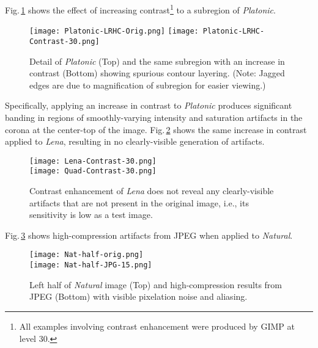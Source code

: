 \documentclass{article}
\begin{document}
Fig.\,\ref{contrast} shows the effect of increasing contrast\footnote{All examples involving
contrast enhancement were produced by GIMP at level 30.} to a subregion of {\em Platonic}.
\begin{figure}
   \centering
   \texttt{[image: Platonic-LRHC-Orig.png]}\vspace{3pt}
   \texttt{[image: Platonic-LRHC-Contrast-30.png]}
\caption{Detail of {\em Platonic} (Top) and the same
subregion with an increase in contrast (Bottom) showing spurious contour layering. (Note: Jagged
edges are due to magnification of subregion for easier viewing.)}
\label{contrast}
\end{figure} 
Specifically, applying an increase in contrast to {\em Platonic} produces
significant banding in regions of smoothly-varying intensity and saturation artifacts in
the corona at the center-top of the image.  Fig.\,\ref{contrastLena} shows
the same increase in contrast applied to {\em Lena}, resulting in no clearly-visible 
generation of artifacts. 

\begin{figure}
   \centering
   \texttt{[image: Lena-Contrast-30.png]}\\ \vspace{3pt}
   \texttt{[image: Quad-Contrast-30.png]}
\caption{Contrast enhancement of {\em Lena} does not reveal any 
clearly-visible artifacts that are not present in the original image, i.e., its sensitivity is low as a test image.}
\label{contrastLena}
\end{figure}


Fig.\,\ref{natcomp} shows high-compression artifacts from JPEG when applied to {\em Natural}. 
\begin{figure}
   \centering
   \texttt{[image: Nat-half-orig.png]}\\ \vspace{3pt}
   \texttt{[image: Nat-half-JPG-15.png]}
\caption{Left half of {\em Natural} image (Top) and high-compression 
results from JPEG (Bottom) with visible pixelation noise and aliasing.}
\label{natcomp}
\end{figure}
\end{document}

